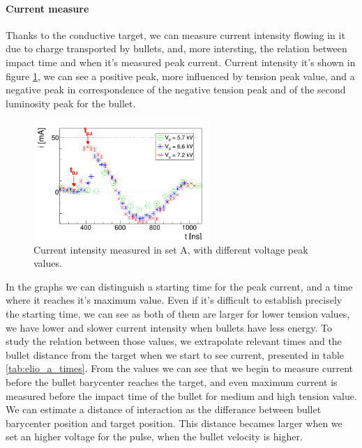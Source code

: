 \paragraph{Current measure}
Thanks to the conductive target, we can measure current intensity flowing in it due to charge transported by bullets, and, more intersting, the relation between impact time and when it's measured peak current.
Current intensity it's shown in figure \ref{fig:elio_a_icurr}, we can see a positive peak, more influenced by tension peak value, and a negative peak in correspondence of the negative tension peak and of the second luminosity peak for the bullet.
\begin{figure}
 \centering
 \includegraphics[width=0.6\textwidth]{Images/Shape/elio_a_icurr.png}
 \caption{Current intensity measured in set A, with different voltage peak values.}
 \label{fig:elio_a_icurr}
\end{figure}

In the graphs we can distinguish a starting time for the peak current, and a time where it reaches it's maximum value. Even if it's difficult to establish precisely the starting time, we can see as both of them are larger for lower tension values, we have lower and slower current intensity when bullets have less energy. To study the relation between those values, we extrapolate relevant times and the bullet distance from the target when we start to see current, presented in table \ref{tab:elio_a_times}. From the values we can see that we begin to measure current before the bullet barycenter reaches the target, and even maximum current is measured before the impact time of the bullet for medium and high tension value.
We can estimate a distance of interaction as the differance between bullet barycenter position and target position. This distance becames larger when we set an higher voltage for the pulse, when the bullet velocity is higher.

